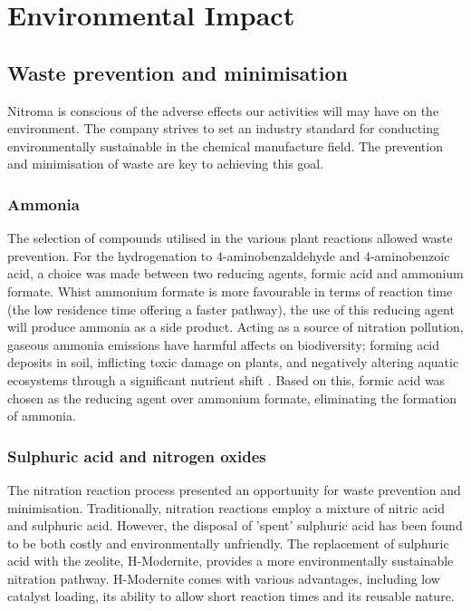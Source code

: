 \section{Environmental Impact}

\subsection{Waste prevention and minimisation}

Nitroma is conscious of the adverse effects our activities will may have on the environment. The company strives to set an industry standard for conducting environmentally sustainable in the chemical manufacture field. The prevention and minimisation of waste are key to achieving this goal. 

\subsubsection{Ammonia}
The selection of compounds utilised in the various plant reactions allowed waste prevention. For the hydrogenation to 4-aminobenzaldehyde and 4-aminobenzoic acid, a choice was made between two reducing agents, formic acid and ammonium formate. Whist ammonium formate is more favourable in terms of reaction time (the low residence time offering a faster pathway), the use of this reducing agent will produce ammonia as a side product. Acting as a  source of nitration pollution, gaseous ammonia emissions have harmful affects on biodiversity; forming acid deposits in soil, inflicting toxic damage on plants, and negatively altering aquatic ecosystems through a significant nutrient shift \cite{european_environment_agency_ammonia_2019}. Based on this, formic acid was chosen as the reducing agent over ammonium formate, eliminating the formation of ammonia. 

\subsubsection{Sulphuric acid and nitrogen oxides}
The nitration reaction process presented an opportunity for waste prevention and minimisation. Traditionally, nitration reactions employ a mixture of nitric acid and sulphuric acid. However, the disposal of 'spent' sulphuric acid has been found to be both costly and environmentally unfriendly. The replacement of sulphuric acid with the zeolite, H-Modernite, provides a more environmentally sustainable nitration pathway. H-Modernite comes with various advantages, including low catalyst loading, its ability to allow short reaction times and its reusable nature. 

